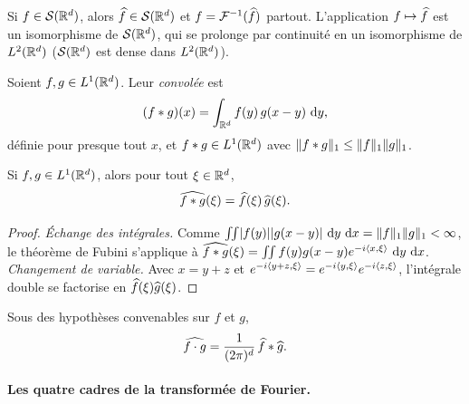\begin{proposition}\label{prop:schwartz-tf}
  Si $f\in\mathcal{S}(\mathbb{R}^d)$, alors $\widehat{f}\in\mathcal{S}(\mathbb{R}^d)$ et $f=\mathcal{F}^{-1}(\widehat{f})$ partout. L'application $f\mapsto\widehat{f}$ est un isomorphisme de $\mathcal{S}(\mathbb{R}^d)$, qui se prolonge par continuité en un isomorphisme de $L^2(\mathbb{R}^d)$ ($\mathcal{S}(\mathbb{R}^d)$ est dense dans $L^2(\mathbb{R}^d)$).
\end{proposition}


\begin{definition}[Convolution]\label{def:conv}
  Soient $f,g\in L^1(\mathbb{R}^d)$. Leur \emph{convolée} est
  \[
    (f*g)(x)=\int_{\mathbb{R}^d}f(y)\,g(x-y)\,\mathop{}\!\mathrm{d} y ,
  \]
  définie pour presque tout $x$, et $f*g\in L^1(\mathbb{R}^d)$ avec $\lVert f*g\rVert_1\le\lVert f\rVert_1\lVert g\rVert_1$.
\end{definition}

\begin{theorem}\label{thm:conv}
  Si $f,g\in L^1(\mathbb{R}^d)$, alors pour tout $\xi\in\mathbb{R}^d$,
  \[
    \widehat{f*g}(\xi)=\widehat{f}(\xi)\,\widehat{g}(\xi).
  \]
\end{theorem}

\begin{proof}
  \emph{Échange des intégrales.} Comme $\iint\lvert f(y)\rvert\lvert g(x-y)\rvert\,\mathop{}\!\mathrm{d} y\,\mathop{}\!\mathrm{d} x=\lVert f\rVert_1\lVert g\rVert_1<\infty$, le théorème de Fubini s'applique à $\widehat{f*g}(\xi)=\iint f(y)g(x-y)e^{-i\langle x,\xi\rangle}\,\mathop{}\!\mathrm{d} y\,\mathop{}\!\mathrm{d} x$.
  \emph{Changement de variable.} Avec $x=y+z$ et $e^{-i\langle y+z,\xi\rangle}=e^{-i\langle y,\xi\rangle}e^{-i\langle z,\xi\rangle}$, l'intégrale double se factorise en $\widehat{f}(\xi)\widehat{g}(\xi)$.
\end{proof}

\begin{proposition}\label{prop:produit}
  Sous des hypothèses convenables sur $f$ et $g$,
  \[
    \widehat{f\cdot g}=\frac{1}{(2\pi)^d}\,\widehat{f}*\widehat{g}.
  \]
\end{proposition}

\paragraph{Les quatre cadres de la transformée de Fourier.} \hfill

